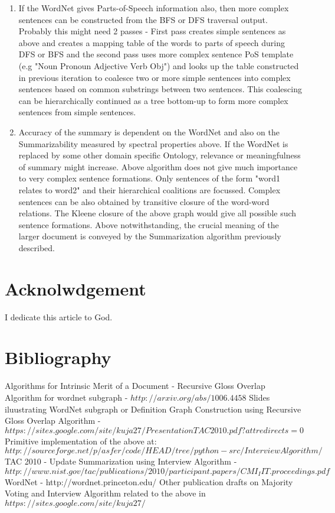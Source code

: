 \documentclass[11pt,onecolumn]{article}
\begin{document}
\begin{enumerate}
\item If the WordNet gives Parts-of-Speech information also, then more complex sentences can be constructed from the BFS or DFS traversal output. Probably this might need 2 passes - First pass creates simple sentences as above and creates a mapping table of the words to parts of speech during DFS or BFS and the second pass uses more complex sentence PoS template (e.g "Noun Pronoun Adjective Verb Obj") and looks up the table constructed in previous iteration to coalesce two or more simple sentences into complex sentences based on common substrings between two sentences. This coalescing can be hierarchically continued as a tree bottom-up to form more complex sentences from simple sentences.

\item Accuracy of the summary is dependent on the WordNet and also on the Summarizability measured by spectral properties above. If the WordNet is replaced by some other domain specific Ontology, relevance or meaningfulness of summary might increase. Above algorithm does not give much importance to very complex sentence formations. Only sentences of the form "word1 relates to word2" and their hierarchical coalitions are focussed. Complex sentences can be also obtained by transitive closure of the word-word relations. The Kleene closure of the above graph would give all possible such sentence formations. Above notwithstanding, the crucial meaning of the larger document is conveyed by the Summarization algorithm previously described. 
\end{enumerate} 
\section{Acknolwdgement}

I dedicate this article to God.

\section{Bibliography}
\begin{thebibliography}{99}
 Algorithms for Intrinsic Merit of a Document - Recursive Gloss Overlap Algorithm for wordnet subgraph - $http://arxiv.org/abs/1006.4458$
 Slides iluustrating WordNet subgraph or Definition Graph Construction using Recursive Gloss Overlap Algorithm - $https://sites.google.com/site/kuja27/PresentationTAC2010.pdf?attredirects=0$
 Primitive implementation of the above at: $http://sourceforge.net/p/asfer/code/HEAD/tree/python-src/InterviewAlgorithm/$
 TAC 2010 - Update Summarization using Interview Algorithm
- $http://www.nist.gov/tac/publications/2010/participant.papers/CMI_IIT.proceedings.pdf$
 WordNet - http://wordnet.princeton.edu/
 Other publication drafts on Majority Voting and Interview Algorithm related to the above in $https://sites.google.com/site/kuja27/$
\end{thebibliography}
\end{document}
